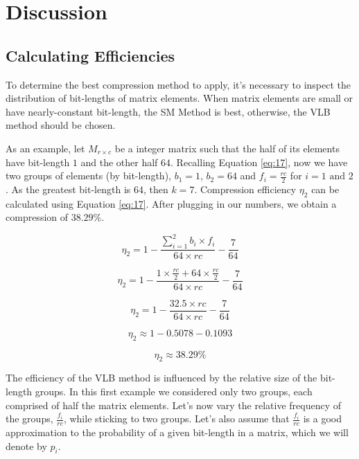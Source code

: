 \documentclass[10pt]{article}
\begin{document}
\section*{Discussion}

\subsection*{Calculating Efficiencies}

To determine the best compression method to apply, it's necessary to inspect the distribution of bit-lengths of matrix elements. When matrix elements are small or have nearly-constant bit-length, the SM Method is best, otherwise, the VLB method should be chosen.

As an example, let $M_{r\times c}$ be a integer matrix such that the half of its elements have bit-length $1$ and the other half $64$. Recalling Equation \ref{eq:17}, now we have two groups of elements (by bit-length), $b_1=1 $, $b_2=64$ and $f_i = \frac{rc}{2}$ for $i = 1 \text{ and } 2$. As the greatest bit-length is $64$, then $k=7$. Compression efficiency $\eta_2$ can be calculated using Equation \ref{eq:17}. After plugging in our numbers, we obtain a compression of $38.29\%$.

\begin{equation*}\label{eq:25}
 \eta_2 = 1 - \frac{\sum_{i=1}^{2}  b_i \times f_i }{64 \times rc} - \frac{7}{64} 
\end{equation*}

\begin{equation*}\label{eq:26}
 \eta_2 = 1 - \frac{  1 \times \frac{rc}{2} + 64 \times \frac{rc}{2} }{64 \times rc} - \frac{7}{64} 
\end{equation*}

\begin{equation*}\label{eq:26}
 \eta_2 = 1 - \frac{  32.5  \times rc }{64 \times rc} - \frac{7}{64} 
\end{equation*}

\begin{equation*}\label{eq:27}
 \eta_2 \approx 1 - 0.5078 - 0.1093
\end{equation*}

\begin{equation*}\label{eq:28}
 \eta_2 \approx 38.29\%
\end{equation*}

The efficiency of the VLB method is influenced by the relative size of the bit-length groups. In this first example we considered only two groups, each comprised of half the matrix elements. Let's now vary the relative frequency of the groups, $\frac{f_i}{rc}$, while sticking to two groups. Let's also assume that $\frac{f_i}{rc}$ is a good approximation to the probability of a given bit-length in a matrix, which we will denote by $p_i$.
\end{document}
